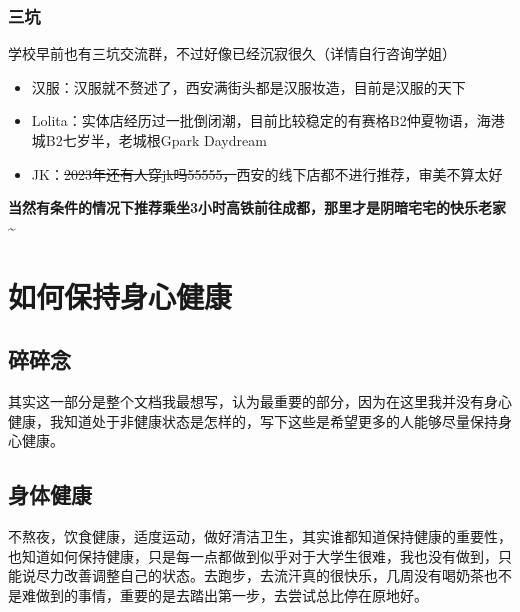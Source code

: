 \documentclass[zihao=-4,fontset=none]{Beautybook-CN}
\begin{document}
\subsection{三坑}

学校早前也有三坑交流群，不过好像已经沉寂很久（详情自行咨询学姐）
\begin{itemize}
\item 汉服：汉服就不赘述了，西安满街头都是汉服妆造，目前是汉服的天下
\item Lolita：实体店经历过一批倒闭潮，目前比较稳定的有赛格B2仲夏物语，海港城B2七岁半，老城根Gpark Daydream
\item JK：\sout{2023年还有人穿jk吗55555，}西安的线下店都不进行推荐，审美不算太好
\end{itemize}

\textbf{当然有条件的情况下推荐乘坐3小时高铁前往成都，那里才是阴暗宅宅的快乐老家\textasciitilde{}}
\chapter{如何保持身心健康}
\section{碎碎念}

其实这一部分是整个文档我最想写，认为最重要的部分，因为在这里我并没有身心健康，我知道处于非健康状态是怎样的，写下这些是希望更多的人能够尽量保持身心健康。

\section{身体健康}

不熬夜，饮食健康，适度运动，做好清洁卫生，其实谁都知道保持健康的重要性，也知道如何保持健康，只是每一点都做到似乎对于大学生很难，我也没有做到，只能说尽力改善调整自己的状态。去跑步，去流汗真的很快乐，几周没有喝奶茶也不是难做到的事情，重要的是去踏出第一步，去尝试总比停在原地好。
\end{document}
